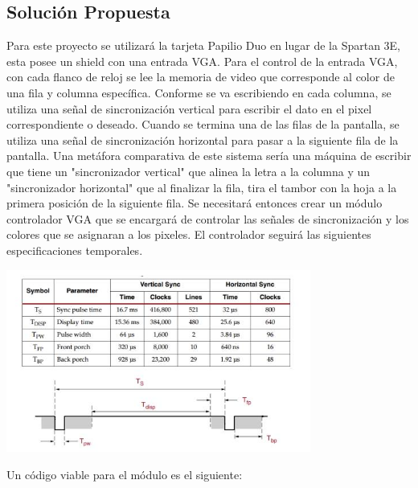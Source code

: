 \documentclass[10pt]{article}
\begin{document}
\subsection*{Solución Propuesta}
Para este proyecto se utilizará la tarjeta Papilio Duo en lugar de la Spartan 3E, esta posee un shield con una entrada VGA.
Para el control de la entrada VGA, con cada flanco de reloj se lee la memoria de video que corresponde al color de una fila y columna específica.
Conforme se va escribiendo en cada columna, se utiliza una señal de sincronización vertical para escribir el dato en el pixel correspondiente o deseado. Cuando se termina una de las filas de la pantalla, se utiliza una señal de sincronización horizontal para pasar a la siguiente fila de la pantalla. Una metáfora comparativa de este sistema sería una máquina de escribir que tiene un "sincronizador vertical" que alinea la letra a la columna y un "sincronizador horizontal" que al finalizar la fila, tira el tambor con la hoja a la primera posición de la siguiente fila.
Se necesitará entonces crear un módulo controlador VGA que se encargará de controlar las señales de sincronización y los colores que se asignaran a los pixeles. El controlador seguirá las siguientes especificaciones temporales.
\begin{center}
\includegraphics[width= 10cm]{sinc.jpg}
\end{center}
Un código viable para el módulo es el siguiente:
\end{document}
